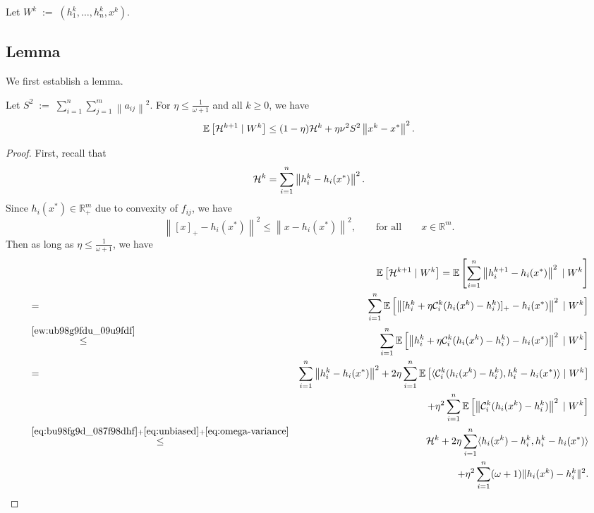 \documentclass[12pt]{article}
\newcommand{\eqdef}{\; { := }\;}
\newcommand{\R}{\mathbb{R}}
\newcommand{\ExpBr}[1]{\mathbb{E}\left[#1\right]}
\newcommand{\norm}[1]{\left\|#1\right\|}
\newcommand{\cC}{{\mathcal{C}}}
\begin{document}
Let $W^k \eqdef (h_1^k, \dots, h_n^k, x^k)$.


\subsection{Lemma}

We first establish a lemma.

\begin{lemma}\label{lm:calHk} Let $S^2\eqdef \sum_{i=1}^n \sum_{j=1}^m \norm{a_{ij}}^2$. For $\eta \leq \frac{1}{\omega+1}$ and all $k\geq 0$, we have 
$$
\ExpBr{ {\cal H}^{k+1} \;|\; W^k} \leq  (1-\eta) {\cal H}^k +  \eta \nu^2 S^2 \norm{x^k - x^*}^2.
$$
\end{lemma}

\begin{proof}
First, recall that
\begin{equation}\label{eq:bu98fg9d_087f98dhf}{\cal H}^{k} =   \sum_{i=1}^n \norm{h_i^{k} - h_i(x^*)}^2 .\end{equation}Since $h_{i}(x^*) \in \R^m_+$ due to convexity of $f_{ij}$, we have \begin{equation} \label{ew:ub98g9fdu_09u9fdf}\norm{[x]_+ - h_i(x^*)}^2 \leq \norm{x - h_i(x^*)}^2, \qquad \text{for all} \qquad x \in \R^m.\end{equation} Then as long as $\eta \leq \frac{1}{\omega+1}$, we have 
\begin{eqnarray}
&&\ExpBr{{\cal H}^{k+1} \;|\; W^k}	= \ExpBr{  \sum_{i=1}^n \norm{h_i^{k+1} - h_i(x^*)}^2  \;|\; W^k} \notag \\ 
	&=&  \sum_{i=1}^n\ExpBr{  \norm{ [h^k_i + \eta \cC_i^k(h_i(x^k) - h^k_i)]_+ - h_i(x^*) }^2  \;|\; W^k} \notag  \\ 
	&\overset{\eqref{ew:ub98g9fdu_09u9fdf}}{\leq} &    \sum_{i=1}^n \ExpBr{\norm{ h^k_i + \eta \cC_i^k(h_i(x^k) - h^k_i) - h_i(x^*) }^2 \;|\; W^k }\notag  \\ 
	&=& \sum_{i=1}^n  \norm{ h_i^k - h_i(x^*) }^2   + 2 \eta\sum_{i=1}^n \ExpBr{  \langle  \cC_i^k(h_i(x^k) - h_i^k),  h_i^k - h_i(x^*) \rangle \;|\; W^k}\notag  \\
	&& \qquad + \eta^2 \sum_{i=1}^n \ExpBr{ \norm{\cC_i^k(h_i(x^k) - h_i^k) }^2 \;|\; W^k} \notag \\ 
	&\overset{\eqref{eq:bu98fg9d_087f98dhf}+\eqref{eq:unbiased} + \eqref{eq:omega-variance}}{\leq} &  {\cal H}^k  + 2\eta \sum_{i=1}^n    \langle  h_i(x^k) - h_i^k, h_i^k - h_i(x^*) \rangle\notag\\
	&& \quad + \eta^2 \sum_{i=1}^n  (\omega+1) \|h_i(x^k) - h_i^k\|^2 .\label{eq:nbu98fd-09ud9f8hufd-fd}
	\end{eqnarray}
	

\end{proof}
\end{document}
